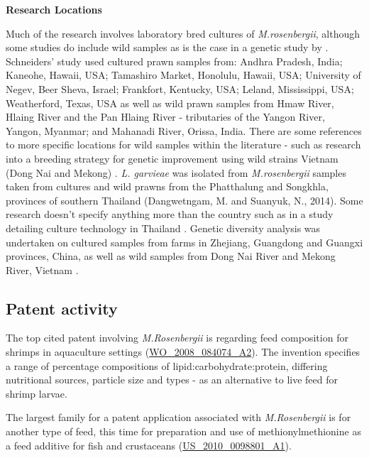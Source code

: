 \documentclass[]{book}
\theoremstyle{definition}
\theoremstyle{definition}
\theoremstyle{definition}
\theoremstyle{remark}
\begin{document}
\textbf{Research Locations}

Much of the research involves laboratory bred cultures of
\emph{M.rosenbergii}, although some studies do include wild samples as
is the case in a genetic study by \citeauthor{Schneider_2012}
\citetext{\citeyear{Schneider_2012}; \citealp{Schneider_2012}}.
Schneiders' study used cultured prawn samples from: Andhra Pradesh,
India; Kaneohe, Hawaii, USA; Tamashiro Market, Honolulu, Hawaii, USA;
University of Negev, Beer Sheva, Israel; Frankfort, Kentucky, USA;
Leland, Mississippi, USA; Weatherford, Texas, USA as well as wild prawn
samples from Hmaw River, Hlaing River and the Pan Hlaing River -
tributaries of the Yangon River, Yangon, Myanmar; and Mahanadi River,
Orissa, India. There are some references to more specific locations for
wild samples within the literature - such as research into a breeding
strategy for genetic improvement using wild strains Vietnam (Dong Nai
and Mekong) \citep{Thanh_2010, Tidwell_2014}. \emph{L. garvieae} was
isolated from \emph{M.rosenbergii} samples taken from cultures and wild
prawns from the Phatthalung and Songkhla, provinces of southern Thailand
(Dangwetngam, M. and Suanyuk, N., 2014). Some research doesn't specify
anything more than the country such as in a study detailing culture
technology in Thailand \citep{Na_Nakorn_2012}. Genetic diversity
analysis was undertaken on cultured samples from farms in Zhejiang,
Guangdong and Guangxi provinces, China, as well as wild samples from
Dong Nai River and Mekong River, Vietnam \citep{Nguyen_Thanh_2015}.

\hypertarget{patent-activity-3}{%
\subsection{Patent activity}\label{patent-activity-3}}

The top cited patent involving \emph{M.Rosenbergii} is regarding feed
composition for shrimps in aquaculture settings
(\href{https://www.lens.org/lens/patent/WO_2008_084074_A2}{WO\_2008\_084074\_A2}).
The invention specifies a range of percentage compositions of
lipid:carbohydrate:protein, differing nutritional sources, particle size
and types - as an alternative to live feed for shrimp larvae.

The largest family for a patent application associated with
\emph{M.Rosenbergii} is for another type of feed, this time for
preparation and use of methionylmethionine as a feed additive for fish
and crustaceans
(\href{https://www.lens.org/lens/patent/US_2010_0098801_A1}{US\_2010\_0098801\_A1}).
\end{document}
